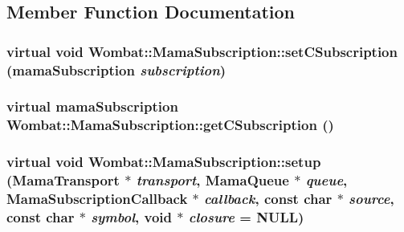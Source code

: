 \subsection{Member Function Documentation}
\hypertarget{classWombat_1_1MamaSubscription_a5241d85ab4b57cd8306a3a4bdb62b380}{
\subsubsection[{setCSubscription}]{\setlength{\rightskip}{0pt plus 5cm}virtual void Wombat::MamaSubscription::setCSubscription (mamaSubscription {\em subscription})}}
\label{classWombat_1_1MamaSubscription_a5241d85ab4b57cd8306a3a4bdb62b380}
\hypertarget{classWombat_1_1MamaSubscription_a8dc9a0e1da068e0d2ef0ec2520d33dc5}{
\subsubsection[{getCSubscription}]{\setlength{\rightskip}{0pt plus 5cm}virtual mamaSubscription Wombat::MamaSubscription::getCSubscription ()}}
\label{classWombat_1_1MamaSubscription_a8dc9a0e1da068e0d2ef0ec2520d33dc5}
\hypertarget{classWombat_1_1MamaSubscription_a856510d1c73d4850c0f069a834cd839d}{
\subsubsection[{setup}]{\setlength{\rightskip}{0pt plus 5cm}virtual void Wombat::MamaSubscription::setup ({\bf MamaTransport} $\ast$ {\em transport}, \/  {\bf MamaQueue} $\ast$ {\em queue}, \/  {\bf MamaSubscriptionCallback} $\ast$ {\em callback}, \/  const char $\ast$ {\em source}, \/  const char $\ast$ {\em symbol}, \/  void $\ast$ {\em closure} = {\ttfamily NULL})}}
\label{classWombat_1_1MamaSubscription_a856510d1c73d4850c0f069a834cd839d}


